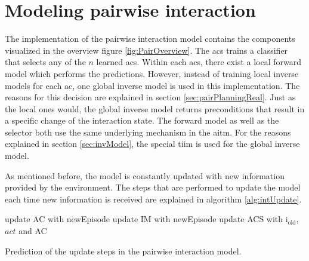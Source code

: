 \section{Modeling pairwise interaction \label{sec:pairRealization}}

The implementation of the pairwise interaction model contains the components visualized in the overview figure \ref{fig:PairOverview}.
The \acrfull{acs} trains a classifier that selects any of the $n$ learned \glspl{ac}. Within each \glspl{ac}, there exist a local forward model which performs the predictions.
However, instead of training local inverse models for each \gls{ac}, one global inverse model is used in this implementation. The reasons for this decision are explained in section \ref{sec:pairPlanningReal}.
Just as the local ones would, the global inverse model returns preconditions that result in a specific change of the interaction state.
The forward model as well as the selector both use the same underlying mechanism in the \acrfull{aitm}. For the reasons explained in section \ref{sec:invModel}, the special \acrfull{tiim} is used for the global inverse model.

As mentioned before, the model is constantly updated with new information provided by the environment. The steps that are performed to update the model each time new information is received are explained in algorithm \ref{alg:intUpdate}.

\begin{algorithm}
\begin{algorithmic}[1]
	\Statex
		  
		\EndIf
		  
		\State update AC with newEpisode
		\State update IM with newEpisode
		\State update ACS with i$_\text{old}$, $act$ and AC
	\EndFor
\end{algorithmic}
\caption{Prediction of the update steps in the pairwise interaction model.}
\label{alg:intUpdate}
\end{algorithm}

